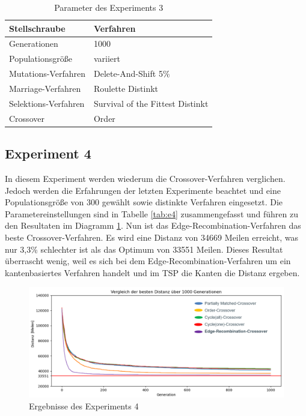 \begin{table}[H]
\centering
\caption{Parameter des Experiments 3}
\begin{tabular}{ll}
Stellschraube & Verfahren \\
\hline
Generationen & 1000 \\
Populationsgröße & variiert \\
Mutations-Verfahren & Delete-And-Shift 5\% \\
Marriage-Verfahren & Roulette Distinkt \\
Selektions-Verfahren & Survival of the Fittest Distinkt \\
Crossover & Order
\end{tabular}
\label{tab:e3}
\end{table}

\subsection{Experiment 4}
In diesem Experiment werden wiederum die Crossover-Verfahren verglichen. Jedoch werden die Erfahrungen der letzten Experimente beachtet und eine Populationsgröße von 300 gewählt sowie distinkte Verfahren eingesetzt.
Die Parametereinstellungen sind in Tabelle \ref{tab:e4} zusammengefasst und führen zu den Resultaten im Diagramm \ref{fig:experiment4}. Nun ist das Edge-Recombination-Verfahren das beste Crossover-Verfahren. Es wird eine Distanz von 34669 Meilen erreicht, was nur 3,3\% schlechter ist als das Optimum von 33551 Meilen. Dieses Resultat überrascht wenig, weil es sich bei dem Edge-Recombination-Verfahren um ein kantenbasiertes Verfahren handelt und im TSP die Kanten die Distanz ergeben.

\begin{figure}[H]
\centering
\includegraphics[width=1\textwidth]{img/Vortrag/experiment4.png}
\caption{Ergebnisse des Experiments 4}
\label{fig:experiment4}
\end{figure}

